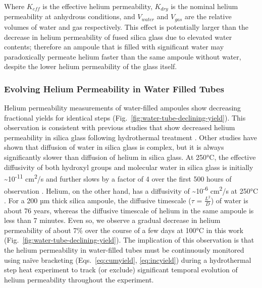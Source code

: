 Where \(K_{eff}\) is the effective helium permeability, \(K_{dry}\) is the nominal helium permeability at anhydrous conditions, and \(V_{water}\) and \(V_{gas}\) are the relative volumes of water and gas respectively. This effect is potentially larger than the decrease in helium permeability of fused silica glass due to elevated water contents; therefore an ampoule that is filled with significant water may paradoxically permeate helium faster than the same ampoule without water, despite the lower helium permeability of the glass itself.

\subsubsection{Evolving Helium Permeability in Water Filled Tubes}\label{evolving-helium-permeability-in-water-filled-tubes}

Helium permeability measurements of water-filled ampoules show decreasing fractional yields for identical steps (Fig.~\ref{fig:water-tube-declining-yield}). This observation is consistent with previous studies that show decreased helium permeability in silica glass following hydrothermal treatment \citep{tsuru2011,masaryk1968}. Other studies have shown that diffusion of water in silica glass is complex, but it is always significantly slower than diffusion of helium in silica glass. At 250°C, the effective diffusivity of both hydroxyl groups and molecular water in silica glass is initially \textasciitilde10\textsuperscript{-11} cm\textsuperscript{2}/s and further slows by a factor of 4 over the first 500 hours of observation \citep{oehler2004}. Helium, on the other hand, has a diffusivity of \textasciitilde10\textsuperscript{-6} cm\textsuperscript{2}/s at 250°C \citep{swets1961}. For a 200 µm thick silica ampoule, the diffusive timescale ($\tau$ = \(\frac{L^{2}}{D}\)) of water is about 76 years, whereas the diffusive timescale of helium in the same ampoule is less than 7 minutes. Even so, we observe a gradual decrease in helium permeability of about 7\% over the course of a few days at 100°C in this work (Fig.~\ref{fig:water-tube-declining-yield}). The implication of this observation is that the helium permeability in water-filled tubes must be continuously monitored using naïve bracketing (Eqs.~\eqref{eq:cumyield}, \eqref{eq:incyield}) during a hydrothermal step heat experiment to track (or exclude) significant temporal evolution of helium permeability throughout the experiment.

